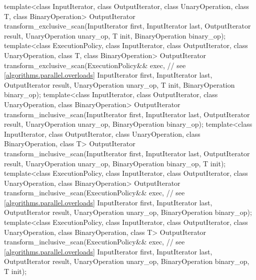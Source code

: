 \begin{codeblock}
{  template<class InputIterator, class OutputIterator,
           class UnaryOperation,
           class T, class BinaryOperation>
    OutputIterator transform_exclusive_scan(InputIterator first, InputIterator last,
                                            OutputIterator result,
                                            UnaryOperation unary_op,
                                            T init, BinaryOperation binary_op);
  template<class ExecutionPolicy, class InputIterator, class OutputIterator,
           class UnaryOperation,
           class T, class BinaryOperation>
    OutputIterator transform_exclusive_scan(ExecutionPolicy&& exec, // see \ref{algorithms.parallel.overloads}
                                            InputIterator first, InputIterator last,
                                            OutputIterator result,
                                            UnaryOperation unary_op,
                                            T init, BinaryOperation binary_op);
  template<class InputIterator, class OutputIterator,
           class UnaryOperation,
           class BinaryOperation>
  OutputIterator transform_inclusive_scan(InputIterator first, InputIterator last,
                                          OutputIterator result,
                                          UnaryOperation unary_op,
                                          BinaryOperation binary_op);
  template<class InputIterator, class OutputIterator,
           class UnaryOperation,
           class BinaryOperation, class T>
  OutputIterator transform_inclusive_scan(InputIterator first, InputIterator last,
                                          OutputIterator result,
                                          UnaryOperation unary_op,
                                          BinaryOperation binary_op, T init);
  template<class ExecutionPolicy, class InputIterator, class OutputIterator,
           class UnaryOperation,
           class BinaryOperation>
  OutputIterator transform_inclusive_scan(ExecutionPolicy&& exec, // see \ref{algorithms.parallel.overloads}
                                          InputIterator first, InputIterator last,
                                          OutputIterator result,
                                          UnaryOperation unary_op,
                                          BinaryOperation binary_op);
  template<class ExecutionPolicy, class InputIterator, class OutputIterator,
           class UnaryOperation,
           class BinaryOperation, class T>
  OutputIterator transform_inclusive_scan(ExecutionPolicy&& exec, // see \ref{algorithms.parallel.overloads}
                                          InputIterator first, InputIterator last,
                                          OutputIterator result,
                                          UnaryOperation unary_op,
                                          BinaryOperation binary_op, T init);

}
\end{codeblock}
